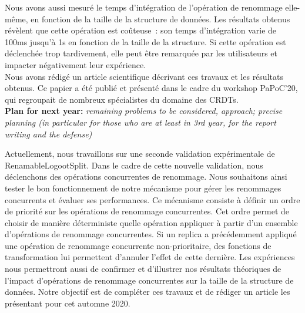 \documentclass[12pt]{article}
\newcommand{\commentaire}[1]{\small\textit{#1}}
\begin{document}
Nous avons aussi mesuré le temps d'intégration de l'opération de renommage elle-même, en fonction de la taille de la structure de données.
Les résultats obtenus révèlent que cette opération est coûteuse~: son temps d'intégration varie de 100ms jusqu'à 1s en fonction de la taille de la structure.
Si cette opération est déclenchée trop tardivement, elle peut être remarquée par les utilisateurs et impacter négativement leur expérience.
\\

Nous avons rédigé un article scientifique décrivant ces travaux et les résultats obtenus. Ce papier a été publié et présenté dans le cadre du workshop PaPoC'20, qui regroupait de nombreux spécialistes du domaine des \acp{CRDT}.
\\

\noindent\textbf{Plan for next year:}
\commentaire{%
  remaining problems to be considered, approach; precise planning (in
  particular for those who are at least in 3rd year, for the report
  writing and the defense)\\}


Actuellement, nous travaillons sur une seconde validation expérimentale de RenamableLogootSplit.
Dans le cadre de cette nouvelle validation, nous déclenchons des opérations concurrentes de renommage.
Nous souhaitons ainsi tester le bon fonctionnement de notre mécanisme pour gérer les renommages concurrents et évaluer ses performances.
Ce mécanisme consiste à définir un ordre de priorité sur les opérations de renommage concurrentes.
Cet ordre permet de choisir de manière déterministe quelle opération appliquer à partir d'un ensemble d'opérations de renommage concurrentes.
Si un replica a précédemment appliqué une opération de renommage concurrente non-prioritaire, des fonctions de transformation lui permettent d'annuler l'effet de cette dernière.
Les expériences nous permettront aussi de confirmer et d'illustrer nos résultats théoriques de l'impact d'opérations de renommage concurrentes sur la taille de la structure de données.
Notre objectif est de compléter ces travaux et de rédiger un article les présentant pour cet automne 2020.
\\
\end{document}
